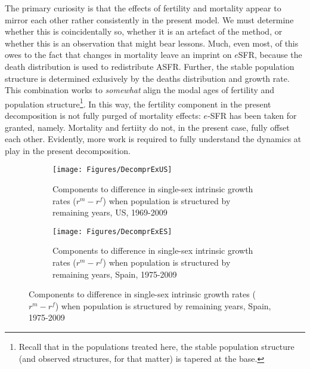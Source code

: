 The primary curiosity is that the effects of fertility and mortality appear to
mirror each other rather consistently in the present model. We must determine
whether this is coincidentally so, whether it is an artefact of the method, or
whether this is an observation that might bear lessons. Much, even most, of this
owes to the fact that changes in mortality leave an imprint on $e$SFR, because
the death distribution is used to redistribute ASFR. Further, the stable
population structure is determined exlusively by the deaths distribution and
growth rate. This combination works to \textit{somewhat} align the modal ages of
fertility and population structure\footnote{Recall that in the populations
treated here, the stable population structure (and observed structures, for
that matter) is tapered at the base.}. In this way, the fertility component in
the present decomposition is not fully purged of mortality effects: $e$-SFR has
been taken for granted, namely. Mortality and fertiity do not, in the present
case, fully offset each other. Evidently, more work is required to fully
understand the dynamics at play in the present decomposition.

\begin{figure}
        \centering
        \begin{subfigure}
                \centering
                \caption{Components to difference in single-sex intrinsic growth
                rates ($r^m - r^f$) when population is structured by remaining
                years, US, 1969-2009}
                \texttt{[image: Figures/DecomprExUS]}
                \label{fig:exDecomprUS}
        \end{subfigure}
        \begin{subfigure}
                \centering
                \caption{Components to difference in single-sex intrinsic growth
                rates ($r^m - r^f$) when population is structured by remaining
                years, Spain, 1975-2009}
                \texttt{[image: Figures/DecomprExES]}
                \label{fig:exDecomprES}
        \end{subfigure}
\end{figure}


























